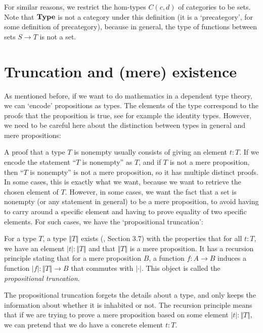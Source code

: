 For similar reasons, we restrict the hom-types $ C(c, d) $ of categories to be sets. Note that $ \mathbf{Type} $ is not a category under this definition (it is a `precategory', for some definition of precategory), because in general, the type of functions between sets $ S \to T $ is not a set.

\section{Truncation and (mere) existence}
As mentioned before, if we want to do mathematics in a dependent type theory, we can `encode' propositions as types. The elements of the type correspond to the proofs that the proposition is true, see for example the identity types. However, we need to be careful here about the distinction between types in general and mere propositions:

A proof that a type $ T $ is nonempty usually consists of giving an element $ t : T $. If we encode the statement ``$ T $ is nonempty'' as $ T $, and if $ T $ is not a mere proposition, then ``$ T $ is nonempty'' is not a mere proposition, so it has multiple distinct proofs. In some cases, this is exactly what we want, because we want to retrieve the chosen element of $ T $. However, in some cases, we want the fact that a set is nonempty (or any statement in general) to be a mere proposition, to avoid having to carry around a specific element and having to prove equality of two specific elements. For such cases, we have the `propositional truncation':

\begin{definition}
  For a type $ T $, a type $ \Vert T \Vert $ exists (\cite{hottbook}, Section 3.7) with the properties that for all $ t: T $, we have an element $ \vert t \vert : \Vert T \Vert $ and that $ \Vert T \Vert $ is a mere proposition. It has a recursion principle stating that for a mere proposition $ B $, a function $ f: A \to B $ induces a function $ \vert f \vert: \Vert T \Vert \to B $ that commutes with $ \vert \cdot \vert $. This object is called the \textit{propositional truncation}.
\end{definition}
The propositional truncation forgets the details about a type, and only keeps the information about whether it is inhabited or not. The recursion principle means that if we are trying to prove a mere proposition based on some element $ \vert t \vert: \Vert T \Vert $, we can pretend that we do have a concrete element $ t: T $.

